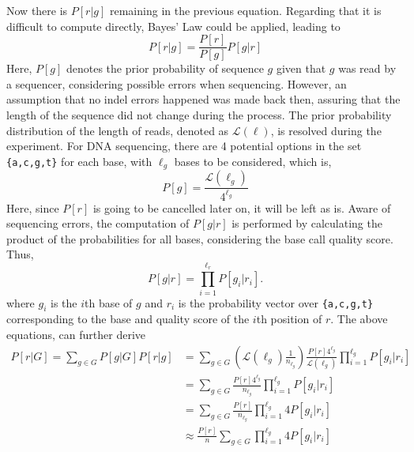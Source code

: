 \documentclass{PHlab-thesis}
\begin{document}
Now there is $P[r|g]$ remaining in the previous equation. Regarding that it is difficult to compute directly, Bayes' Law could be applied, leading to
\begin{equation*}
P[r|g] = \frac{P[r]}{P[g]} P[g|r]
\end{equation*}
Here, $P[g]$ denotes the prior probability of sequence $g$ given that $g$ was read by a sequencer, considering possible errors when sequencing. However, an assumption that no indel errors happened was made back then, assuring that the length of the sequence did not change during the process. The prior probability distribution of the length of reads, denoted as $\mathcal{L}(\ell)$, is resolved during the experiment. For DNA sequencing, there are 4 potential options in the set \texttt{\{a,c,g,t\}} for each base, with $\ell_g$ bases to be considered, which is,
\begin{equation*}
P[g] =  \frac{\mathcal{L}(\ell_g)}{4^{\ell_g}}
\end{equation*}
Here, since $P[r]$ is going to be cancelled later on, it will be left as is. Aware of sequencing errors, the computation of $P[g|r]$ is performed by calculating the product of the probabilities for all bases, considering the base call quality score. Thus,
\begin{equation}
P[g|r] = \prod_{i=1}^{\ell_r} P[g_i|r_i].
\end{equation}
where $g_i$ is the $i$th base of $g$ and $r_i$ is the probability vector over \texttt{\{a,c,g,t\}} corresponding to the base and quality score of the $i$th position of $r$. The above equations, can further derive
\begin{equation*}
\begin{split}
P[r|G] =  \sum_{g\in G} P[g|G] P[r|g] &= \sum_{g\in G} \left( \mathcal{L}(\ell_g) \frac{1}{n_{\ell_g}} \right) \frac{P[r]4^{\ell_g}}{\mathcal{L}(\ell_g)} \prod_{i=1}^{\ell_g} P[g_i|r_i]  \\
                                      &= \sum_{g\in G} \frac{P[r]4^{\ell_g}}{n_{\ell_g}} \prod_{i=1}^{\ell_g} P[g_i|r_i]  \\
                                      &= \sum_{g\in G} \frac{P[r]}{n_{\ell_g}} \prod_{i=1}^{\ell_g} 4P[g_i|r_i]  \\
                                      &\approx \frac{P[r]}{n} \sum_{g\in G} \prod_{i=1}^{\ell_g} 4P[g_i|r_i]  \\
\end{split}
\end{equation*}
\end{document}
